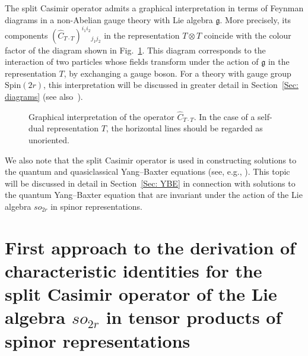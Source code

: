 \documentclass[a4paper]{article}
\newcommand{\hC}{\widehat{C}}
\newcommand{\Spin}{\mathrm{Spin}}
\renewcommand{\=}{\ =\ }
\newcommand{\okg}{\overline{\mathsf{g}}}
\newcommand{\mfg}{\mathfrak{g}}
\numberwithin{equation}{section}
\theoremstyle{remark}
\begin{document}
The split Casimir operator admits a graphical interpretation in terms of Feynman diagrams in a non-Abelian gauge theory with Lie algebra $\mfg$. More precisely, its components $(\hC_{T\cdot T})^{i_1 i_2}{}_{j_1 j_2}$ in the representation $T\otimes T$ coincide with the colour factor of the diagram shown in Fig.~\ref{Split Casimir graphic representation}. This diagram corresponds to the interaction of two particles whose fields transform under the action of $\mfg$ in the representation $T$, by exchanging a gauge boson. For a theory with gauge group $\Spin(2r)$, this interpretation will be discussed in greater detail in Section~\ref{Sec: diagrams} (see also~\cite{IsPr:Colour}).

\begin{figure}
\centering
{}
\caption{Graphical interpretation of the operator $\hC_{T\cdot T}$. In the case of a self-dual representation $T$, the horizontal lines should be regarded as unoriented.}
\label{Split Casimir graphic representation}
\end{figure}

We also note that the split Casimir operator is used in constructing solutions to the quantum and quasiclassical Yang--Baxter equations (see, e.g., \cite{MacKay,ChaPr,IsQGLect}). This topic will be discussed in detail in Section~\ref{Sec: YBE} in connection with solutions to the quantum Yang--Baxter equation that are invariant under the action of the Lie algebra $so_{2r}$ in spinor representations.

\section{First approach to the derivation of characteristic identities for the split Casimir operator of the Lie algebra $so_{2r}$ in tensor products of spinor representations}
\end{document}
